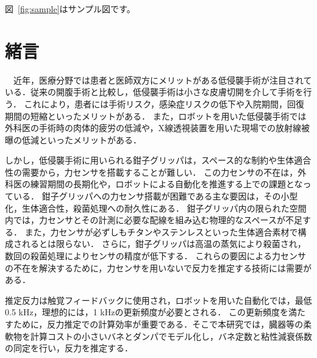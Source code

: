 \documentclass[a4paper]{jarticle}
\begin{document}
図~\ref{fig:sample}はサンプル図です。
\fi

\section{緒言}
　近年，医療分野では患者と医師双方にメリットがある低侵襲手術が注目されている\cite{MIS_ref1}．従来の開腹手術と比較し，低侵襲手術は小さな皮膚切開を介して手術を行う．
これにより，患者には手術リスク，感染症リスクの低下\cite{MIS_ref2}や入院期間\cite{MIS_ref3}，回復期間の短縮\cite{MIS_ref4}といったメリットがある．
また，ロボットを用いた低侵襲手術では外科医の手術時の肉体的疲労の低減や，X線透視装置を用いた現場での放射線被曝の低減といったメリットがある\cite{MIS_ref5}．

しかし，低侵襲手術に用いられる鉗子グリッパは，スペース的な制約\cite{MIS_ref1}や生体適合性の需要\cite{MIS_ref6}から，力センサを搭載することが難しい．
この力センサの不在は，外科医の練習期間の長期化\cite{MIS_learning_time}や，ロボットによる自動化を推進する上での課題となっている\cite{RMIS}．
鉗子グリッパへの力センサ搭載が困難である主な要因は，その小型化，生体適合性，殺菌処理への耐久性にある\cite{MIS_ref7}．
鉗子グリッパ内の限られた空間内では，力センサとその計測に必要な配線を組み込む物理的なスペースが不足する\cite{MIS_ref1}．
また，力センサが必ずしもチタンやステンレスといった生体適合素材で構成されるとは限らない\cite{MIS_ref6}．
さらに，鉗子グリッパは高温の蒸気により殺菌され，数回の殺菌処理によりセンサの精度が低下する\cite{MIS_ref7}．
これらの要因による力センサの不在を解決するために，力センサを用いないで反力を推定する技術には需要がある．

 推定反力は触覚フィードバックに使用され，ロボットを用いた自動化では，最低0.5 kHz\cite{fps_ref1}，理想的には，1 kHzの更新頻度が必要とされる\cite{fps_ref2}．
この更新頻度を満たすために，反力推定での計算効率が重要である．そこで本研究では，臓器等の柔軟物を計算コストの小さいバネとダンパでモデル化し，バネ定数と粘性減衰係数の同定を行い，反力を推定する．

\end{document}
